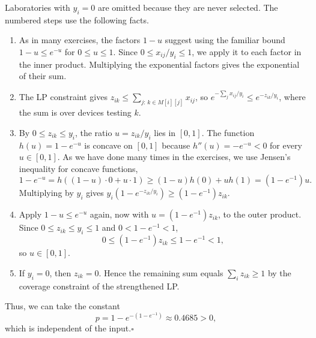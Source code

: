 \documentclass[12pt,a4paper]{article}
\begin{document}
Laboratories with $y_i=0$ are omitted because they are never selected.
The numbered steps use the following facts.
\begin{enumerate}
\item As in many exercises, the factors $1-u$ suggest using the familiar
bound $1-u\leq e^{-u}$ for $0\leq u\leq1$. Since
$0\leq x_{ij}/y_i\leq1$, we apply it to each factor in the inner
product. Multiplying the exponential factors gives
the exponential of their sum.
\item The LP constraint gives
$z_{ik}\leq\sum_{j:\,k\in M[i][j]}x_{ij}$, so
$e^{-\sum_j x_{ij}/y_i}\leq e^{-z_{ik}/y_i}$, where the sum is over
devices testing $k$.
\item By $0\leq z_{ik}\leq y_i$, the ratio $u=z_{ik}/y_i$ lies in
$[0,1]$. The function $h(u)=1-e^{-u}$ is concave on $[0,1]$ because
$h''(u)=-e^{-u}<0$ for every $u\in[0,1]$.
As we have done many times in the exercises, we use Jensen's inequality
for concave functions,
\[
1-e^{-u}=h((1-u)\cdot0+u\cdot1)
\geq(1-u)h(0)+uh(1)=(1-e^{-1})u.
\]
Multiplying by $y_i$ gives
$y_i(1-e^{-z_{ik}/y_i})\geq(1-e^{-1})z_{ik}$.
\item Apply $1-u\leq e^{-u}$ again, now with
$u=(1-e^{-1})z_{ik}$, to the outer product. Since
$0\leq z_{ik}\leq y_i\leq1$ and $0<1-e^{-1}<1$,
\[
0\leq(1-e^{-1})z_{ik}\leq1-e^{-1}<1,
\]
so $u\in[0,1]$.
\item If $y_i=0$, then $z_{ik}=0$. Hence the remaining sum equals
$\sum_i z_{ik}\geq1$ by the coverage constraint of the strengthened LP.
\end{enumerate}
Thus, we can take the constant
\[
p=1-e^{-(1-e^{-1})}\approx0.4685>0,
\]
which is independent of the input.\hfill$\square$
\end{document}
